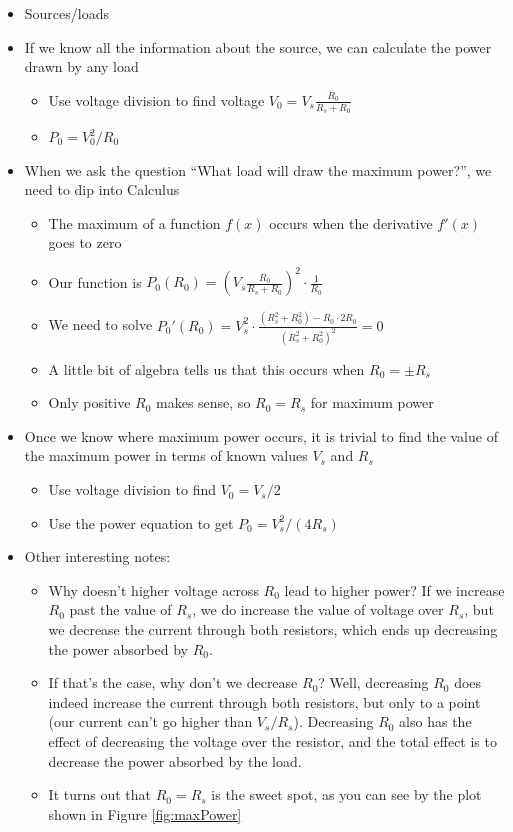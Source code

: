 \begin{itemize}
\item Sources/loads
\item If we know all the information about the source, we can calculate the power drawn by any load
  \begin{itemize}
  \item Use voltage division to find voltage $V_0 = V_s \frac{R_0}{R_s+R_0}$
  \item $P_0=V_0^2/R_0$
  \end{itemize}
\item When we ask the question ``What load will draw the maximum power?'', we need to dip into Calculus
  \begin{itemize}
  \item The maximum of a function $f(x)$ occurs when the derivative $f'(x)$ goes to zero
  \item Our function is $\displaystyle P_0(R_0)=\left( V_s \frac{R_0}{R_s+R_0}\right)^2 \cdot \frac{1}{R_0}$
  \item We need to solve $\displaystyle P_0'(R_0) = V_s^2 \cdot \frac{(R_s^2+R_0^2)-R_0\cdot 2 R_0}{(R_s^2+R_0^2)^2} = 0$
  \item A little bit of algebra tells us that this occurs when $R_0 = \pm R_s$
  \item Only positive $R_0$ makes sense, so $R_0=R_s$ for maximum power
  \end{itemize}
\item Once we know where maximum power occurs, it is trivial to find the value of the maximum power in terms of known values $V_s$ and $R_s$
  \begin{itemize}
  \item Use voltage division to find $V_0=V_s/2$
  \item Use the power equation to get $P_0=V_s^2/(4 R_s)$
  \end{itemize}
\item Other interesting notes:
  \begin{itemize}
  \item Why doesn't higher voltage across $R_0$ lead to higher power? If we increase $R_0$ past the value of $R_s$, we do increase the value of voltage over $R_s$, but we decrease the current through both resistors, which ends up decreasing the power absorbed by $R_0$.
  \item If that's the case, why don't we decrease $R_0$?  Well, decreasing $R_0$ does indeed increase the current through both resistors, but only to a point (our current can't go higher than $V_s/R_s$).  Decreasing $R_0$ also has the effect of decreasing the voltage over the resistor, and the total effect is to decrease the power absorbed by the load.
  \item It turns out that $R_0=R_s$ is the sweet spot, as you can see by the plot shown in Figure \ref{fig:maxPower}
  \end{itemize}
\end{itemize}

